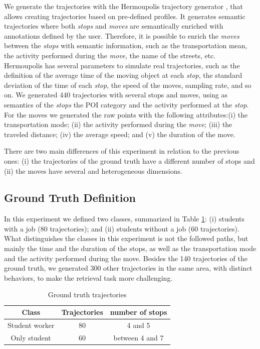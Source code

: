{We generate the trajectories with the  Hermoupolis trajectory generator} \cite{Pelekis-Hermoupolis}{, that allows creating trajectories based on pre-defined profiles. It generates semantic trajectories where both \emph{stops} and \emph{moves} are semantically enriched with annotations defined by the user. Therefore, it is possible to enrich the \emph{moves} between the \emph{stops} with semantic information, such as the transportation mean, the activity performed during the \emph{move}, the name of the streets, etc. Hermoupolis has several parameters to simulate real trajectories, such as the definition of the average time of the moving object at each \emph{stop}, the standard deviation of the time of each \emph{stop}, the speed of the moves, sampling rate, and so on. We generated 440 trajectories with several stops and moves, using as semantics of the \emph{stops} the POI category and the activity performed at the \emph{stop}. For the moves we generated the raw points with the following attributes:(i) the transportation mode; (ii) the activity performed during the \emph{move}; (iii) the traveled distance; (iv) the average speed; and (v) the duration of the move.}

{There are two main differences of this experiment in relation to the previous ones: (i) the trajectories of the ground truth have a different number of stops and (ii) the moves have several and heterogeneous dimensions.}

\subsection{Ground Truth Definition}
{In this experiment we defined two classes, summarized in Table {\ref{tab:hermoupolis_dataset}}: (i) students with a job (80 trajectories); and (ii) students without a job (60 trajectories). What distinguishes the classes in this experiment is not the followed paths, but mainly the time and the duration  of the stops, as well as the transportation mode and the activity performed during the move. Besides the 140 trajectories of the ground truth, we generated 300 other trajectories in the same area, with distinct behaviors, to make the retrieval task more challenging.}

\begin{table}[ht!]
\scriptsize
  \centering
  \begin{tabular}{|c|c|c|}
  \hline
  Class & Trajectories & number of stops \\
  \hline
Student worker & 80 & 4 and 5 \\
Only student & 60 & between 4 and 7 \\
    \hline
  \end{tabular}
  \caption{Ground truth trajectories}
  \label{tab:hermoupolis_dataset}
\end{table}

